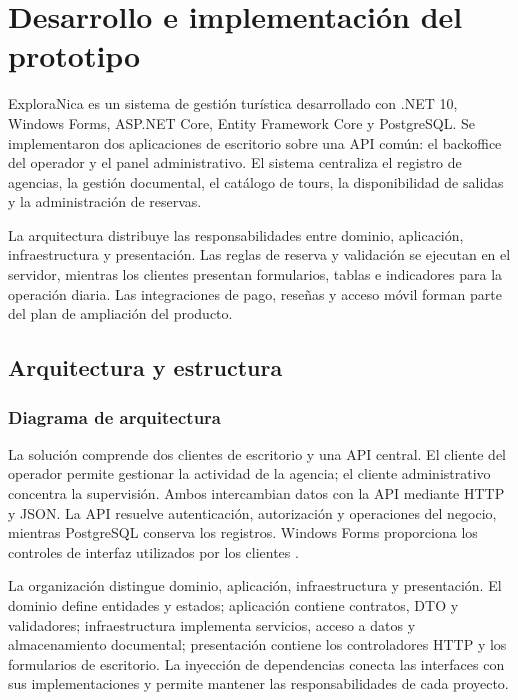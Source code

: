 \chapter{Desarrollo e implementación del prototipo}
\label{cap:implementacion}

ExploraNica es un sistema de gestión turística desarrollado con .NET 10, Windows Forms, ASP.NET Core, Entity Framework Core y PostgreSQL. Se implementaron dos aplicaciones de escritorio sobre una API común: el backoffice del operador y el panel administrativo. El sistema centraliza el registro de agencias, la gestión documental, el catálogo de tours, la disponibilidad de salidas y la administración de reservas.

La arquitectura distribuye las responsabilidades entre dominio, aplicación, infraestructura y presentación. Las reglas de reserva y validación se ejecutan en el servidor, mientras los clientes presentan formularios, tablas e indicadores para la operación diaria. Las integraciones de pago, reseñas y acceso móvil forman parte del plan de ampliación del producto.

\section{Arquitectura y estructura}
\subsection{Diagrama de arquitectura}
La solución comprende dos clientes de escritorio y una API central. El cliente del operador permite gestionar la actividad de la agencia; el cliente administrativo concentra la supervisión. Ambos intercambian datos con la API mediante HTTP y JSON. La API resuelve autenticación, autorización y operaciones del negocio, mientras PostgreSQL conserva los registros. Windows Forms proporciona los controles de interfaz utilizados por los clientes \cite{ref15}.

La organización distingue dominio, aplicación, infraestructura y presentación. El dominio define entidades y estados; aplicación contiene contratos, DTO y validadores; infraestructura implementa servicios, acceso a datos y almacenamiento documental; presentación contiene los controladores HTTP y los formularios de escritorio. La inyección de dependencias conecta las interfaces con sus implementaciones y permite mantener las responsabilidades de cada proyecto.

